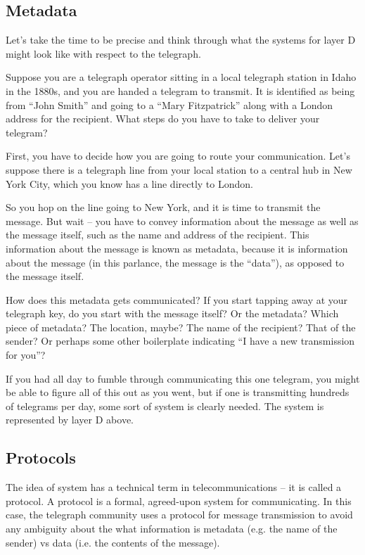 \documentclass[UTF8]{book}
\begin{document}
\begin{CJK}{UTF8}{gbsn}
\subsection{Metadata}

Let's take the time to be precise and think through what the systems for layer D might look like with respect to the telegraph.

Suppose you are a telegraph operator sitting in a local telegraph station in Idaho in the 1880s, and you are handed a telegram to transmit. It is identified as being from ``John Smith'' and going to a ``Mary Fitzpatrick'' along with a London address for the recipient. What steps do you have to take to deliver your telegram?

First, you have to decide how you are going to route your communication. Let's suppose there is a telegraph line from your local station to a central hub in New York City, which you know has a line directly to London.

So you hop on the line going to New York, and it is time to transmit the message. But wait – you have to convey information about the message as well as the message itself, such as the name and address of the recipient. This information about the message is known as metadata, because it is information about the message (in this parlance, the message is the “data”), as opposed to the message itself.

How does this metadata gets communicated? If you start tapping away at your telegraph key, do you start with the message itself? Or the metadata? Which piece of metadata? The location, maybe? The name of the recipient? That of the sender? Or perhaps some other boilerplate indicating “I have a new transmission for you”?

If you had all day to fumble through communicating this one telegram, you might be able to figure all of this out as you went, but if one is transmitting hundreds of telegrams per day, some sort of system is clearly needed. The system is represented by layer D above.

\subsection{Protocols}

The idea of system has a technical term in telecommunications – it is called a protocol. A protocol is a formal, agreed-upon system for communicating. In this case, the telegraph community uses a protocol for message transmission to avoid any ambiguity about the what information is metadata (e.g. the name of the sender) vs data (i.e. the contents of the message).


\end{CJK}
\end{document}

